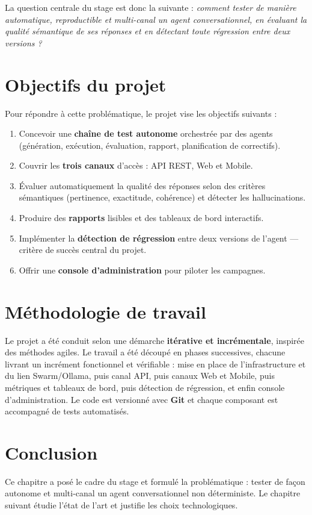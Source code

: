 \documentclass[12pt,a4paper,oneside]{report}
\begin{document}
La question centrale du stage est donc la suivante : \emph{comment tester de manière
automatique, reproductible et multi-canal un agent conversationnel, en évaluant la
qualité sémantique de ses réponses et en détectant toute régression entre deux
versions ?}

\section{Objectifs du projet}
Pour répondre à cette problématique, le projet vise les objectifs suivants :
\begin{enumerate}[leftmargin=*]
  \item Concevoir une \textbf{chaîne de test autonome} orchestrée par des agents
  (génération, exécution, évaluation, rapport, planification de correctifs).
  \item Couvrir les \textbf{trois canaux} d'accès : API REST, Web et Mobile.
  \item Évaluer automatiquement la qualité des réponses selon des critères
  sémantiques (pertinence, exactitude, cohérence) et détecter les hallucinations.
  \item Produire des \textbf{rapports} lisibles et des tableaux de bord interactifs.
  \item Implémenter la \textbf{détection de régression} entre deux versions de
  l'agent — critère de succès central du projet.
  \item Offrir une \textbf{console d'administration} pour piloter les campagnes.
\end{enumerate}

\section{Méthodologie de travail}
Le projet a été conduit selon une démarche \textbf{itérative et incrémentale},
inspirée des méthodes agiles. Le travail a été découpé en phases successives, chacune
livrant un incrément fonctionnel et vérifiable : mise en place de l'infrastructure et
du lien Swarm/Ollama, puis canal API, puis canaux Web et Mobile, puis métriques et
tableaux de bord, puis détection de régression, et enfin console d'administration. Le
code est versionné avec \textbf{Git} et chaque composant est accompagné de tests
automatisés.

\section{Conclusion}
Ce chapitre a posé le cadre du stage et formulé la problématique : tester de façon
autonome et multi-canal un agent conversationnel non déterministe. Le chapitre suivant
étudie l'état de l'art et justifie les choix technologiques.
\end{document}
